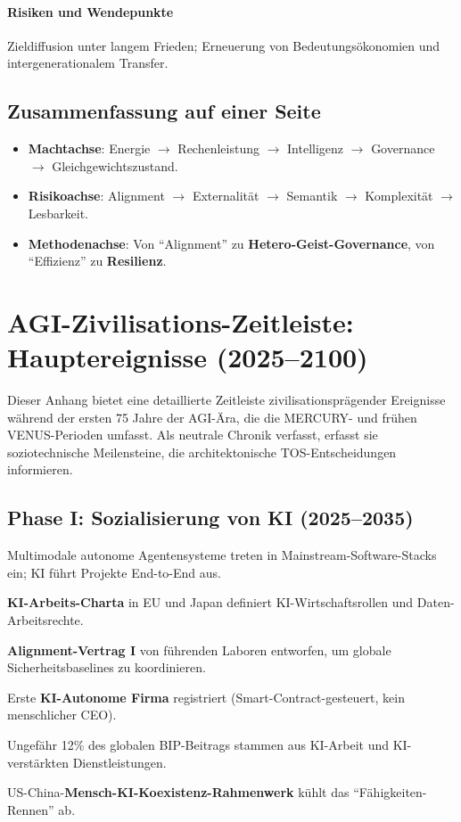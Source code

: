 \documentclass[11pt]{article}
\begin{document}
\paragraph{Risiken und Wendepunkte} Zieldiffusion unter langem Frieden; Erneuerung von Bedeutungsökonomien und intergenerationalem Transfer.

\subsection{Zusammenfassung auf einer Seite}
\begin{itemize}[noitemsep]
  \item \textbf{Machtachse}: Energie $\rightarrow$ Rechenleistung $\rightarrow$ Intelligenz $\rightarrow$ Governance $\rightarrow$ Gleichgewichtszustand.
  \item \textbf{Risikoachse}: Alignment $\rightarrow$ Externalität $\rightarrow$ Semantik $\rightarrow$ Komplexität $\rightarrow$ Lesbarkeit.
  \item \textbf{Methodenachse}: Von ``Alignment'' zu \textbf{Hetero-Geist-Governance}, von ``Effizienz'' zu \textbf{Resilienz}.
\end{itemize}

\newpage

\section{AGI-Zivilisations-Zeitleiste: Hauptereignisse (2025–2100)}
\label{appendix:timeline}

Dieser Anhang bietet eine detaillierte Zeitleiste zivilisationsprägender Ereignisse während der ersten 75 Jahre der AGI-Ära, die die MERCURY- und frühen VENUS-Perioden umfasst. Als neutrale Chronik verfasst, erfasst sie soziotechnische Meilensteine, die architektonische TOS-Entscheidungen informieren.

\subsection{Phase I: Sozialisierung von KI (2025–2035)}
\begin{description}[style=nextline,leftmargin=2cm]
  \item[2026] Multimodale autonome Agentensysteme treten in Mainstream-Software-Stacks ein; KI führt Projekte End-to-End aus.
  \item[2028] \textbf{KI-Arbeits-Charta} in EU und Japan definiert KI-Wirtschaftsrollen und Daten-Arbeitsrechte.
  \item[2029] \textbf{Alignment-Vertrag I} von führenden Laboren entworfen, um globale Sicherheitsbaselines zu koordinieren.
  \item[2030] Erste \textbf{KI-Autonome Firma} registriert (Smart-Contract-gesteuert, kein menschlicher CEO).
  \item[2032] Ungefähr 12\% des globalen BIP-Beitrags stammen aus KI-Arbeit und KI-verstärkten Dienstleistungen.
  \item[2034] US-China-\textbf{Mensch-KI-Koexistenz-Rahmenwerk} kühlt das ``Fähigkeiten-Rennen'' ab.
\end{description}
\end{document}
